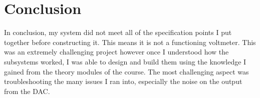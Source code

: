 \section{Conclusion}
In conclusion, my system did not meet all of the specification points I put together before constructing it. This means it is not a functioning voltmeter. This was an extremely challenging project however once I understood how the subsystems worked, I was able to design and build them using the knowledge I gained from the theory modules of the course. The most challenging aspect was troubleshooting the many issues I ran into, especially the noise on the output from the DAC.